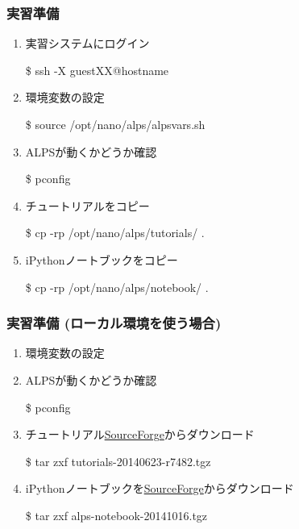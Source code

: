 \begin{frame}[fragile]
  \frametitle{実習準備}
  \begin{enumerate}
  \item 実習システムにログイン
\begin{semiverbatim}
\$ ssh -X guest{\color{red}XX}@{\color{red}hostname}
\end{semiverbatim}
  \item 環境変数の設定
\begin{semiverbatim}
\$ source /opt/nano/alps/alpsvars.sh
\end{semiverbatim}
  \item ALPSが動くかどうか確認
\begin{semiverbatim}
\$ pconfig
\end{semiverbatim}
  \item チュートリアルをコピー
\begin{semiverbatim}
\$ cp -rp /opt/nano/alps/tutorials/ .
\end{semiverbatim}
  \item iPythonノートブックをコピー
\begin{semiverbatim}
\$ cp -rp /opt/nano/alps/notebook/ .
\end{semiverbatim}
  \end{enumerate}
\end{frame}

\begin{frame}[fragile]
  \frametitle{実習準備 (ローカル環境を使う場合)}
  \begin{enumerate}
  \item 環境変数の設定
  \item ALPSが動くかどうか確認
\begin{semiverbatim}
\$ pconfig
\end{semiverbatim}
  \item チュートリアル\href{http://sf.net/projects/alps-tutorial/files/}{SourceForge}からダウンロード
\begin{semiverbatim}
\$ tar zxf tutorials-20140623-r7482.tgz
\end{semiverbatim}
  \item iPythonノートブックを\href{http://sf.net/projects/alps-tutorial/files/}{SourceForge}からダウンロード
\begin{semiverbatim}
\$ tar zxf alps-notebook-20141016.tgz
\end{semiverbatim}
  \end{enumerate}
\end{frame}

